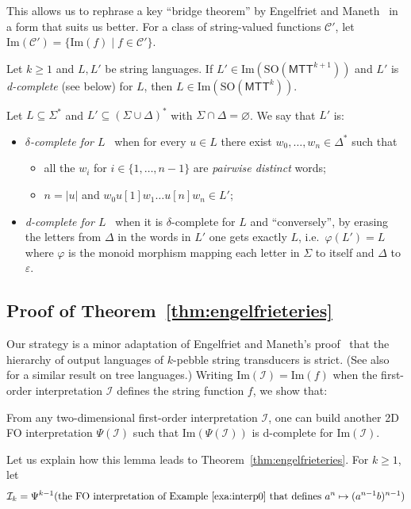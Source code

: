 \documentclass{fundam}
\newcommand{\Image}{\mathrm{Im}}
\newcommand{\cC}{\mathcal{C}}
\newcommand{\cI}{\mathcal{I}}
\newcommand{\MTT}{\mathsf{MTT}}
\newcommand{\SO}{\mathrm{SO}}
\theoremstyle{claimstyle}
\begin{document}
This allows us to rephrase a key \enquote{bridge theorem} by Engelfriet and Maneth~\cite{OutputMacro} in a form that suits us better. For a class of string-valued functions $\cC'$, let $\Image(\cC') = \{\Image(f) \mid f \in \cC'\}$.
\begin{theorem}
  \label{thm:bridge}
  Let $k \geq 1$ and $L,L'$ be string languages. If $L' \in
  \Image(\SO(\MTT^{k+1}))$ and $L'$ is \emph{d-complete} (see below) for $L$, then $L\in\Image(\SO(\MTT^k))$.
\end{theorem}
\begin{definition}\label{def:d-complete}
  Let $L \subseteq \Sigma^*$ and $L' \subseteq (\Sigma \cup \Delta)^*$ with $\Sigma \cap \Delta = \varnothing$. We say that $L'$ is:
    \begin{itemize}
    \item \emph{$\delta$-complete for $L$}~\cite[\S5]{OutputMacro} when for every $u \in L$ there exist $w_0, \dots, w_n \in \Delta^*$ such that
    \begin{itemize}
      \item all the $w_i$ for $i\in\{1,\dots,n-1\}$ are \emph{pairwise distinct} words;
      \item $n = |u|$ and $w_0 u[1] w_1 \ldots u[n] w_n \in L'$;
    \end{itemize}
    \item \emph{d-complete for $L$}~\cite[\S4]{PebbleString} when it is $\delta$-complete for $L$ and \enquote{conversely}, by erasing the letters from $\Delta$ in the words in $L'$ one gets exactly $L$,
    i.e.\ $\varphi(L') = L$ where $\varphi$ is the monoid morphism mapping each letter in $\Sigma$ to itself and $\Delta$ to $\varepsilon$.
  \end{itemize}
\end{definition}


\subsection{Proof of Theorem~\ref{thm:engelfrieteries}}
\label{sec:engelfrieteries-proof}

Our strategy is a minor adaptation of Engelfriet and Maneth's proof~\cite[\S4]{PebbleString} that the hierarchy of output languages of $k$-pebble string transducers is strict.
(See also~\cite[Theorem~41]{EngelfrietPebbleMacro} for a similar result on tree languages.)
Writing $\Image(\cI) = \Image(f)$ when the first-order interpretation $\cI$ defines the string function $f$, we show that:
\begin{lemma}\label{lem:engelfrieteries}
  From any two-dimensional first-order interpretation $\cI$, one can build another 2D FO interpretation $\Psi(\cI)$ such that $\Image(\Psi(\cI))$ is d-complete for $\Image(\cI)$.
\end{lemma}
Let us explain how this lemma leads to Theorem~\ref{thm:engelfrieteries}. For $k\geq1$, let
\[ \cI_k = \Psi^{k-1}(\text{the FO interpretation of
    Example~\ref{exa:interp0} that defines}\ a^n \mapsto (a^{n-1}b)^{n-1}) \]
\end{document}
